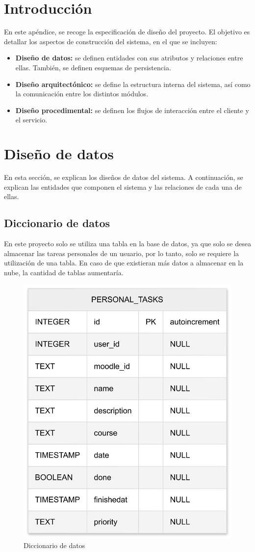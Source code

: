 
\section{Introducción}
En este apéndice, se recoge la especificación de diseño del proyecto. El objetivo es detallar los aspectos de construcción del sistema, en el que se incluyen:
\begin{itemize}
    \item \textbf{Diseño de datos:} se definen entidades con sus atributos y relaciones entre ellas. También, se definen esquemas de persistencia.
    \item \textbf{Diseño arquitectónico:} se define la estructura interna del sistema, así como la comunicación entre los distintos módulos.
    \item \textbf{Diseño procedimental:} se definen los flujos de interacción entre el cliente y el servicio.
\end{itemize}

\section{Diseño de datos}
En esta sección, se explican los diseños de datos del sistema. A continuación, se explican las entidades que componen el sistema y las relaciones de cada una de ellas.

\subsection{Diccionario de datos}
En este proyecto solo se utiliza una tabla en la base de datos, ya que solo se desea almacenar las tareas personales de un usuario, por lo tanto, solo se requiere la utilización de una tabla. En caso de que existieran más datos a almacenar en la nube, la cantidad de tablas aumentaría.

\begin{figure}[H]
    \centering
    \includegraphics[width=0.6\linewidth]{img/diccionario_datos.png}
    \caption{Diccionario de datos}
    \label{fig:diccionario_datos}
\end{figure}

